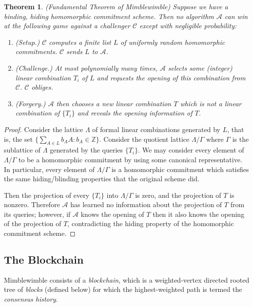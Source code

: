 \documentclass[letterpaper]{article}
\newtheorem{thrm}{Theorem}
\begin{document}
\begin{thrm} (Fundamental Theorem of Mimblewimble) Suppose we have
a binding, hiding homomorphic commitment scheme. Then no algorithm
$\mathcal{A}$ can win at the following game against a challenger
$\mathcal{C}$ except with negligible probability:
\begin{enumerate}
\item (Setup.) $\mathcal{C}$ computes a finite list $L$ of uniformly
random homomorphic commitments. $\mathcal{C}$ sends $L$ to $\mathcal{A}$.
\item (Challenge.) At most polynomially many times, $\mathcal{A}$
selects some (integer) linear combination $T_i$ of $L$ and requests the
opening of this combination from $\mathcal{C}$. $\mathcal{C}$ obliges.
\item (Forgery.) $\mathcal{A}$ then chooses a new linear
combination $T$ which is not a linear combination of $\{T_i\}$ and reveals
the opening information of $T$.
\end{enumerate}
\label{fundamental}
\end{thrm}
\begin{proof}
Consider the lattice $\Lambda$ of formal linear combinations generated by $L$,
that is, the set $\{ \sum_{A\in L} b_A A : b_A \in \mathbb{Z}\}$. Consider the
quotient lattice $\Lambda/\Gamma$ where $\Gamma$ is the sublattice of
$\Lambda$ generated by the queries $\{T_i\}$. We may consider every
element of $\Lambda/\Gamma$ to be a homomorphic commitment by using
some canonical representative. In particular, every element of
$\Lambda/\Gamma$ is a homomorphic commitment which satisfies the same
hiding/blinding properties that the original scheme did.

Then the projection of every $\{T_i\}$ into $\Lambda/\Gamma$ is zero,
and the projection of $T$ is nonzero. Therefore $\mathcal{A}$ has
learned no information about the projection of $T$ from its queries;
however, if $\mathcal{A}$ knows the opening of $T$ then it also knows
the opening of the projection of $T$, contradicting the hiding
property of the homomorphic commitment scheme.
\end{proof}

\subsection{The Blockchain\label{sec:bc}}

Mimblewimble consists of a \emph{blockchain}, which is a weighted-vertex
directed rooted tree of \emph{blocks} (defined below) for which the
highest-weighted path is termed the \emph{consensus history}.
\end{document}
